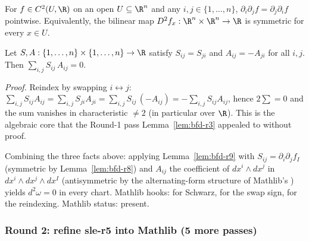 \begin{lemma}
\label{lem:bfd-r8}
For $f\in C^{2}(U,\R)$ on an open $U\subseteq\R^{n}$ and any
$i,j\in\{1,\ldots,n\}$, $\partial_{i}\partial_{j}f = \partial_{j}\partial_{i}f$ pointwise.  Equivalently, the bilinear map
$D^{2}f_{x}: \R^{n}\times\R^{n}\to\R$ is symmetric for every $x\in U$.
\leanok\mathlibok
\end{lemma}

\begin{lemma}[Pass bfd.9: $\sum_{i,j} S_{ij}\,A_{ij} = 0$ for $S$ symmetric and $A$ antisymmetric]
\label{lem:bfd-r9}
Let $S, A : \{1,\ldots,n\}\times\{1,\ldots,n\}\to\R$ satisfy
$S_{ij}=S_{ji}$ and $A_{ij}=-A_{ji}$ for all $i,j$.  Then
$\sum_{i,j} S_{ij}\,A_{ij} = 0$.

\emph{Proof.}  Reindex by swapping $i\leftrightarrow j$:
$\sum_{i,j} S_{ij}A_{ij} = \sum_{i,j} S_{ji}A_{ji}
                       = \sum_{i,j} S_{ij}\,(-A_{ij})
                       = -\sum_{i,j} S_{ij}A_{ij}$,
hence $2\sum=0$ and the sum vanishes in characteristic $\neq 2$
(in particular over $\R$).  This is the algebraic core that the
Round-1 pass Lemma~\ref{lem:bfd-r3} appealed to without proof.
\leanok\mathlibok
\end{lemma}

\begin{lemma}[Pass bfd.10: Mathlib endpoint for $d^{2}=0$]
\label{lem:bfd-r10}
Combining the three facts above: applying Lemma~\ref{lem:bfd-r9} with
$S_{ij} = \partial_{i}\partial_{j}f_{I}$ (symmetric by
Lemma~\ref{lem:bfd-r8}) and $A_{ij}$ the coefficient of $dx^{i}\wedge dx^{j}$ in $dx^{i}\wedge dx^{j}\wedge dx^{I}$ (antisymmetric by
the alternating-form structure of Mathlib's )
yields $d^{2}\omega=0$ in every chart.  Mathlib hooks:
 for Schwarz,
 for the swap sign,
 for the reindexing.  Mathlib status: present.
\leanok\mathlibok
\end{lemma}

\subsubsection*{Round 2: refine sle-r5 into Mathlib (5 more passes)}

